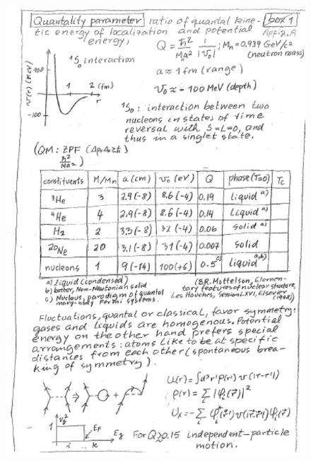 \documentclass[a4paper,11pt]{book}
\numberwithin{equation}{section}
\numberwithin{figure}{section}
\numberwithin{table}{section}
\begin{document}
\begin{figure}
\centerline{\includegraphics*[width=\textwidth,angle=0]{figs/box1.pdf}}
\caption{}\label{box1}
\end{figure}
\end{document}
